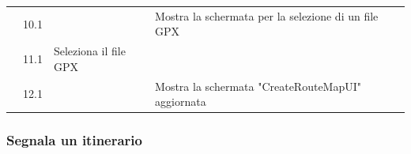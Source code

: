 \documentclass{natourDoc}
\begin{document}
\begin{tabularx}{\linewidth}{| l | p{1cm} | p{4cm} | X | X|}
	\cline{2-5}                   & 10.1                                                                                                                                   &                                                                                                                                                                      & Mostra la schermata per la selezione di un file GPX &                                                                                       \\

	\cline{2-5}                   & 11.1                                                                                                                                   & Seleziona il file GPX                                                                                                                                                &                                                     &                                                                                       \\

	\cline{2-5}                   & 12.1                                                                                                                                   &                                                                                                                                                                      & Mostra la schermata "CreateRouteMapUI" aggiornata      &                                                                                       \\

	\hline
\end{tabularx}

\newpage

\subsubsection{Segnala un itinerario}
\end{document}
